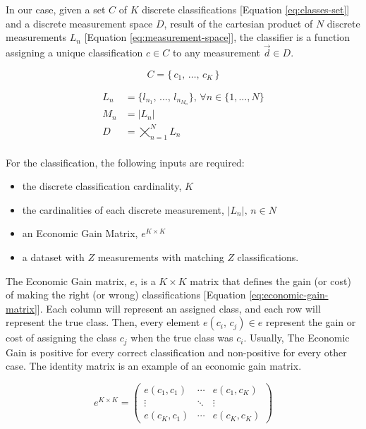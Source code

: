 \documentclass[letterpaper, conference]{IEEEtran}
\begin{document}
In our case, given a set $C$ of $K$ discrete classifications [Equation \ref{eq:classes-set}] and a discrete measurement space $D$, result of the cartesian product of $N$ discrete measurements $L_n$ [Equation \ref{eq:measurement-space}], the classifier is a function assigning a unique classification $c \in C$ to any measurement $\vec{d} \in D$.

\begin{equation}\label{eq:classes-set}
C = \{\,c_1,\, \dots,\, c_{K}\,\}
\end{equation}


\begin{equation}\label{eq:measurement-space}
  \begin{aligned}
  L_n &= \{l_{n_1},\, \dots,\, l_{n_{M_n}}\},\, \forall n \in \{ 1, ..., N \} \\
  M_n &= \vert L_n\vert \\
  D &= \bigtimes_{n=1}^{N} L_n \\
  \end{aligned}
\end{equation}

For the classification, the following inputs are required:

\begin{itemize}
  \item the discrete classification cardinality, $K$
  \item the cardinalities of each discrete measurement, $\vert L_n \vert,\, n \in N$
  \item an Economic Gain Matrix, $e^{K \times K}$
  \item a dataset with $Z$ measurements with matching $Z$ classifications. 
\end{itemize}

The Economic Gain matrix, $e$, is a $K \times K$ matrix that defines the gain (or cost) of making the right (or wrong) classifications [Equation \ref{eq:economic-gain-matrix}]. Each column will represent an assigned class, and each row will represent the true class. Then, every element $e(c_i,\, c_j) \in e$ represent the gain or cost of assigning the class $c_j$ when the true class was $c_i$. Usually, The Economic Gain is positive for every correct classification and non-positive for every other case. The identity matrix is an example of an economic gain matrix.

\begin{equation}\label{eq:economic-gain-matrix}
  e^{K \times K} = \begin{pmatrix}
    e(c_1,c_1) & \cdots & e(c_1,c_K) \\
      \vdots   & \ddots &    \vdots   \\
    e(c_K,c_1) & \cdots & e(c_K,c_K)
  \end{pmatrix}
\end{equation}
\end{document}
